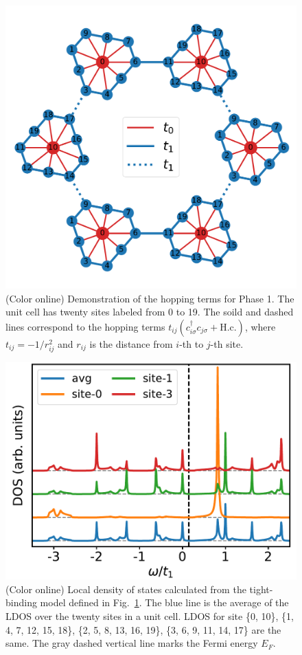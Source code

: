 \documentclass[aps,prb,amsfonts,amsmath,amssymb,showpacs,groupedaddress,superscriptaddress]{revtex4-1}
\begin{document}
\begin{figure}[p]
    \includegraphics[width=\columnwidth]{fig/ModelForPhase1.pdf}
    \caption{\label{fig:ModelForPhase1} (Color online) Demonstration of the hopping terms for Phase 1. The unit cell has twenty sites labeled from 0 to 19. The soild and dashed lines correspond to the hopping terms $t_{ij} (c_{i\sigma}^{\dagger} c_{j\sigma} + \text{H.c.})$, where $t_{ij} = -1/r_{ij}^{2}$ and $r_{ij}$ is the distance from $i$-th to $j$-th site.}
\end{figure}

\begin{figure}[p]
    \includegraphics[width=\columnwidth]{fig/TBAForPhase1.pdf}
    \caption{\label{fig:TBAForPhase1} (Color online) Local density of states calculated from the tight-binding model defined in Fig.~\ref{fig:ModelForPhase1}. The blue line is the average of the LDOS over the twenty sites in a unit cell. LDOS for site \{0, 10\}, \{1, 4, 7, 12, 15, 18\}, \{2, 5, 8, 13, 16, 19\}, \{3, 6, 9, 11, 14, 17\} are the same. The gray dashed vertical line marks the Fermi energy $E_{F}$.}
\end{figure}
\end{document}
